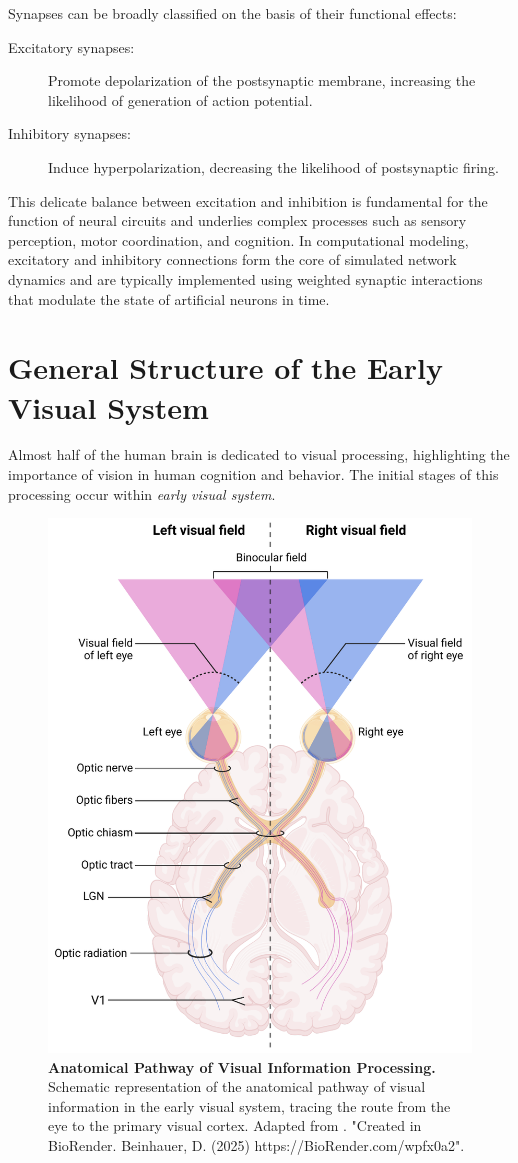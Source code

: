 Synapses can be broadly classified on the basis of their functional effects:

\begin{description}
    \item[Excitatory synapses:] Promote depolarization of the postsynaptic membrane, increasing the likelihood of generation of action potential.
    \item[Inhibitory synapses:] Induce hyperpolarization, decreasing the likelihood of postsynaptic firing.
\end{description}

This delicate balance between excitation and inhibition is fundamental for the function of neural circuits and underlies complex processes such as sensory perception, motor coordination, and cognition. In computational modeling, excitatory and inhibitory connections form the core of simulated network dynamics and are typically implemented using weighted synaptic interactions that modulate the state of artificial neurons in time.

\section{General Structure of the Early Visual System}
\label{sec:general_structure}

Almost half of the human brain is dedicated to visual processing, highlighting the importance of vision in human cognition and behavior. The initial stages of this processing occur within \emph{early visual system}.

\begin{figure}
    \centering
    \includegraphics[width=0.6\linewidth]{img/visual_pathway.pdf}
    \caption{\textbf{Anatomical Pathway of Visual Information Processing.} Schematic representation of the anatomical pathway of visual information in the early visual system, tracing the route from the eye to the primary visual cortex. Adapted from \citet{yaramothu2014short}. "Created in BioRender. Beinhauer, D. (2025) https://BioRender.com/wpfx0a2".}
    \label{fig:visual_system_pathway}
\end{figure}

